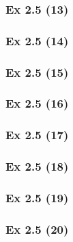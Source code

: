 \subsubsection{Ex 2.5 (13)}\label{sec:Ex_2.5.13}

\subsubsection{Ex 2.5 (14)}\label{sec:Ex_2.5.14}

\subsubsection{Ex 2.5 (15)}\label{sec:Ex_2.5.15}

\subsubsection{Ex 2.5 (16)}\label{sec:Ex_2.5.16}

\subsubsection{Ex 2.5 (17)}\label{sec:Ex_2.5.17}

\subsubsection{Ex 2.5 (18)}\label{sec:Ex_2.5.18}

\subsubsection{Ex 2.5 (19)}\label{sec:Ex_2.5.19}

\subsubsection{Ex 2.5 (20)}\label{sec:Ex_2.5.20}
